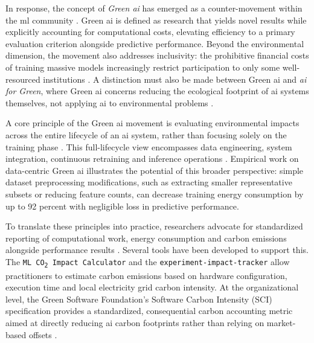 In response, the concept of \textit{Green \gls{ai}} has emerged as a counter-movement within the \gls{ml} community \parencite{schwartzGreenAI2020}. Green \gls{ai} is defined as research that yields novel results while explicitly accounting for computational costs, elevating efficiency to a primary evaluation criterion alongside predictive performance. Beyond the environmental dimension, the movement also addresses inclusivity: the prohibitive financial costs of training massive models increasingly restrict participation to only some well-resourced institutions \parencite{schwartzGreenAI2020}. A distinction must also be made between Green \gls{ai} and \textit{\gls{ai} for Green}, where Green \gls{ai} concerns reducing the ecological footprint of \gls{ai} systems themselves, not applying \gls{ai} to environmental problems \parencite{vanwynsbergheSustainableAIAI2021}.

A core principle of the Green \gls{ai} movement is evaluating environmental impacts across the entire lifecycle of an \gls{ai} system, rather than focusing solely on the training phase \parencite{GreenAIPosition, eilamMethodologyFrameworkAI2023}. This full-lifecycle view encompasses data engineering, system integration, continuous retraining and inference operations \parencite{eilamMethodologyFrameworkAI2023}. Empirical work on data-centric Green \gls{ai} \parencite{verdecchiaDataCentricGreenAI2022a} illustrates the potential of this broader perspective: simple dataset preprocessing modifications, such as extracting smaller representative subsets or reducing feature counts, can decrease training energy consumption by up to 92 percent with negligible loss in predictive performance.

To translate these principles into practice, researchers advocate for standardized reporting of computational work, energy consumption and carbon emissions alongside performance results \parencite{schwartzGreenAI2020, hendersonSystematicReportingEnergy2020}. Several tools have been developed to support this. The \texttt{ML CO\textsubscript{2} Impact Calculator} \parencite{lacosteQuantifyingCarbonEmissions2019} and the \texttt{experiment-impact-tracker} \parencite{hendersonSystematicReportingEnergy2020} allow practitioners to estimate carbon emissions based on hardware configuration, execution time and local electricity grid carbon intensity. At the organizational level, the Green Software Foundation's Software Carbon Intensity (SCI) specification \parencite{SoftwareCarbonIntensity} provides a standardized, consequential carbon accounting metric aimed at directly reducing \gls{ai} carbon footprints rather than relying on market-based offsets \parencite{dodgeMeasuringCarbonIntensity2022, eilamMethodologyFrameworkAI2023}.

